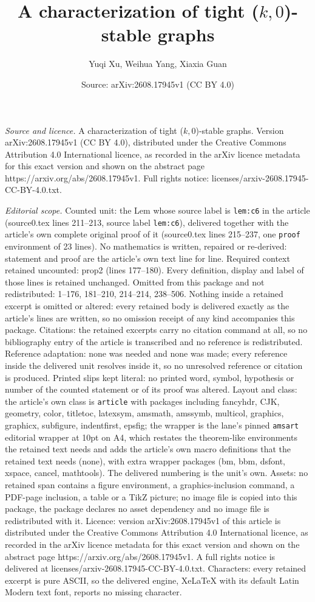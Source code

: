 \documentclass[10pt,a4paper]{amsart}
\title[A characterization of tight ($ k, 0 $)-stable graphs]{A characterization of tight ($ k, 0 $)-stable graphs}
\author{Yuqi Xu, Weihua Yang, Xiaxia Guan}
\date{Source: arXiv:2608.17945v1 (CC BY 4.0)}
\begin{document}
\maketitle

\noindent\emph{Source and licence.} A characterization of tight ($ k, 0 $)-stable graphs. Version arXiv:2608.17945v1 (CC BY 4.0), distributed under the Creative Commons Attribution 4.0 International licence, as recorded in the arXiv licence metadata for this exact version and shown on the abstract page https://arxiv.org/abs/2608.17945v1. Full rights notice: licenses/arxiv-2608.17945-CC-BY-4.0.txt.\par\smallskip

\noindent\textit{Editorial scope.} Counted unit: the Lem whose source label is \texttt{lem:c6} in the article (source0.tex lines 211--213, source label \texttt{lem:c6}), delivered together with the article's own complete original proof of it (source0.tex lines 215--237, one \texttt{proof} environment of 23 lines). No mathematics is written, repaired or re-derived: statement and proof are the article's own text line for line. Required context retained uncounted: prop2 (lines 177--180). Every definition, display and label of those lines is retained unchanged. Omitted from this package and not redistributed: 1--176, 181--210, 214--214, 238--506. Nothing inside a retained excerpt is omitted or altered: every retained body is delivered exactly as the article's lines are written, so no omission receipt of any kind accompanies this package. Citations: the retained excerpts carry no citation command at all, so no bibliography entry of the article is transcribed and no reference is redistributed. Reference adaptation: none was needed and none was made; every reference inside the delivered unit resolves inside it, so no unresolved reference or citation is produced. Printed slips kept literal: no printed word, symbol, hypothesis or number of the counted statement or of its proof was altered. Layout and class: the article's own class is \texttt{article} with packages including fancyhdr, CJK, geometry, color, titletoc, latexsym, amsmath, amssymb, multicol, graphics, graphicx, subfigure, indentfirst, epsfig; the wrapper is the lane's pinned \texttt{amsart} editorial wrapper at 10pt on A4, which restates the theorem-like environments the retained text needs and adds the article's own macro definitions that the retained text needs (none), with extra wrapper packages (bm, bbm, dsfont, xspace, cancel, mathtools). The delivered numbering is the unit's own. Assets: no retained span contains a figure environment, a graphics-inclusion command, a PDF-page inclusion, a table or a TikZ picture; no image file is copied into this package, the package declares no asset dependency and no image file is redistributed with it. Licence: version arXiv:2608.17945v1 of this article is distributed under the Creative Commons Attribution 4.0 International licence, as recorded in the arXiv licence metadata for this exact version and shown on the abstract page https://arxiv.org/abs/2608.17945v1. A full rights notice is delivered at licenses/arxiv-2608.17945-CC-BY-4.0.txt. Characters: every retained excerpt is pure ASCII, so the delivered engine, XeLaTeX with its default Latin Modern text font, reports no missing character.
\end{document}
